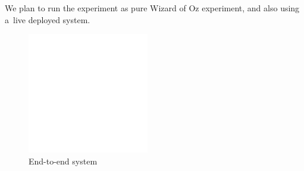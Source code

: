 \documentclass[11pt]{article}
\begin{document}
We plan to run the experiment as pure Wizard of Oz experiment, and also using a~live deployed system.

\begin{figure}[htpb]
    \centering
    \includegraphics[width=0.8\linewidth]{todo}
    \caption{End-to-end system}
    \label{fig:e2end}
\end{figure}
\end{document}

